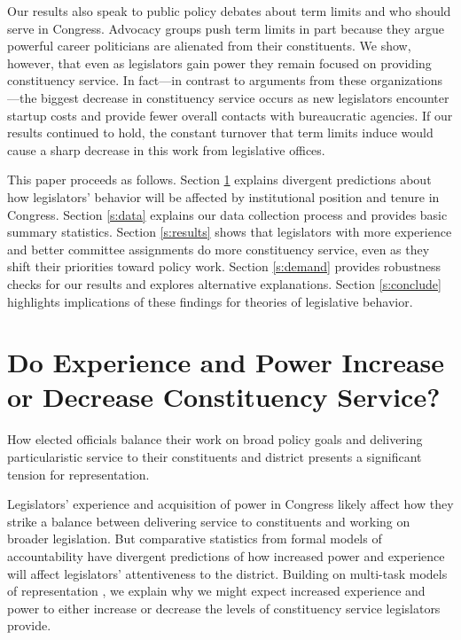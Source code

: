 \documentclass[12pt]{article}
\begin{document}
Our results also speak to public policy debates about term limits and who should serve in Congress. Advocacy groups push term limits in part because they argue powerful career politicians are alienated from their constituents.  We show, however, that even as legislators gain power they remain focused on providing constituency service.  In fact---in contrast to arguments from these organizations---the biggest decrease in constituency service occurs as new legislators encounter startup costs and provide fewer overall contacts with bureaucratic agencies.  If our results continued to hold, the constant turnover that term limits induce would cause a sharp decrease in this work from legislative offices.  



This paper proceeds as follows. Section \ref{s:theory} explains divergent predictions about how legislators' behavior will be affected by institutional position and tenure in Congress. Section \ref{s:data} explains our data collection process and provides basic summary statistics. Section \ref{s:results} shows that legislators with more experience and better committee assignments do more constituency service, even as they shift their priorities toward policy work. Section \ref{s:demand} provides robustness checks for our results and explores alternative explanations. Section \ref{s:conclude} highlights implications of these findings for theories of legislative behavior.


\section{Do Experience and Power Increase or Decrease Constituency Service?} \label{s:theory}

How elected officials balance their work on broad policy goals and delivering particularistic service to their constituents and district presents a significant tension for representation.

Legislators' experience and acquisition of power in Congress likely affect how they strike a balance between delivering service to constituents and working on broader legislation. But comparative statistics from formal models of accountability have divergent predictions of how increased power and experience will affect legislators' attentiveness to the district. Building on multi-task models of representation \citep{AshworthBuenodeMesquita2006, gordon2009advantages}, we explain why we might expect increased experience and power to either increase or decrease the levels of constituency service legislators provide.
\end{document}
